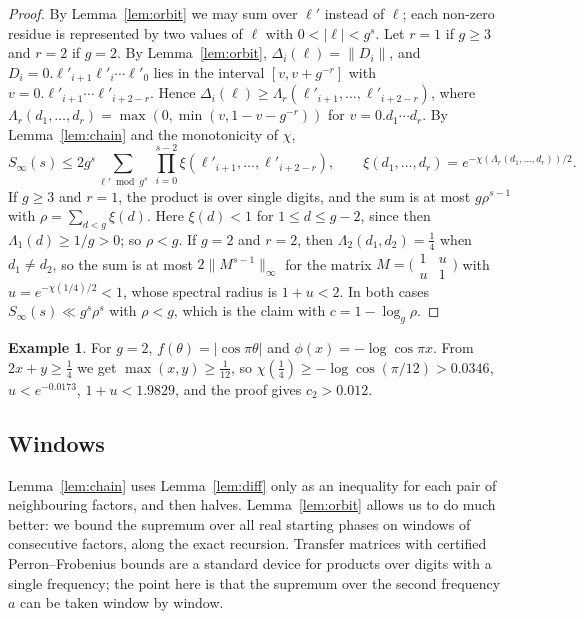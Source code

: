 \documentclass[11pt]{amsart}
\theoremstyle{definition}
\newtheorem{example}[theorem]{Example}
\numberwithin{equation}{section}
\newcommand{\Sinf}{S_\infty}
\begin{document}
\begin{proof}
By Lemma~\ref{lem:orbit} we may sum over $\ell'$ instead of $\ell$; each
non-zero residue is represented by two values of $\ell$ with
$0<|\ell|<g^s$. Let $r=1$ if $g\ge3$ and $r=2$ if $g=2$. By
Lemma~\ref{lem:orbit}, $\Delta_i(\ell)=\|D_i\|$, and
$D_i=0.\ell'_{i+1}\ell'_i\cdots\ell'_0$ lies in the interval $[v,v+g^{-r}]$
with $v=0.\ell'_{i+1}\cdots\ell'_{i+2-r}$. Hence $\Delta_i(\ell)\ge
\Lambda_r(\ell'_{i+1},\dots,\ell'_{i+2-r})$, where
$\Lambda_r(d_1,\dots,d_r)=\max(0,\min(v,1-v-g^{-r}))$ for $v=0.d_1\cdots d_r$.
By Lemma~\ref{lem:chain} and the monotonicity of $\chi$,
\[
\Sinf(s)\le2g^s\sum_{\ell'\bmod g^s}\ \prod_{i=0}^{s-2}\xi(\ell'_{i+1},\dots,\ell'_{i+2-r}),\qquad
\xi(d_1,\dots,d_r)=e^{-\chi(\Lambda_r(d_1,\dots,d_r))/2}.
\]
If $g\ge3$ and $r=1$, the product is over single digits, and the sum is at
most $g\rho^{s-1}$ with $\rho=\sum_{d<g}\xi(d)$. Here $\xi(d)<1$ for $1\le d\le
g-2$, since then $\Lambda_1(d)\ge1/g>0$; so $\rho<g$. If $g=2$ and $r=2$, then
$\Lambda_2(d_1,d_2)=\frac14$ when $d_1\ne d_2$, so the sum is at most
$2\|M^{s-1}\|_\infty$ for the matrix $M=\bigl(\begin{smallmatrix}1&u\\u&1\end{smallmatrix}\bigr)$
with $u=e^{-\chi(1/4)/2}<1$, whose spectral radius is $1+u<2$. In both
cases $\Sinf(s)\ll g^s\rho^s$ with $\rho<g$, which is the claim with
$c=1-\log_g\rho$.
\end{proof}

\begin{example}\label{ex:hand}
For $g=2$, $f(\theta)=|\cos\pi\theta|$ and $\phi(x)=-\log\cos\pi x$. From
$2x+y\ge\frac14$ we get $\max(x,y)\ge\frac1{12}$, so
$\chi(\frac14)\ge-\log\cos(\pi/12)>0.0346$, $u<e^{-0.0173}$,
$1+u<1.9829$, and the proof gives $c_2>0.012$.
\end{example}

\subsection{Windows}\label{subsec:windows}
Lemma~\ref{lem:chain} uses Lemma~\ref{lem:diff} only as an inequality for
each pair of neighbouring factors, and then halves. Lemma~\ref{lem:orbit}
allows us to do much better: we bound the supremum over all real starting
phases on windows of consecutive factors, along the exact recursion.
Transfer matrices with certified Perron--Frobenius bounds are a standard
device for products over digits with a single frequency; the point here is
that the supremum over the second frequency $a$ can be taken window by
window.
\end{document}
